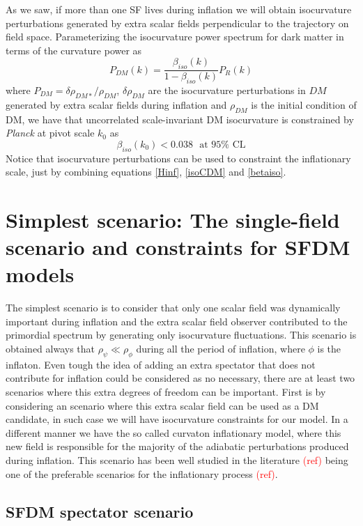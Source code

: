 \documentclass[amssymb,twocolumn,prd,nofootinbib,showpacs]{revtex4-1}
\begin{document}
As we saw, if more than one SF lives during inflation we will obtain isocurvature perturbations generated by extra scalar fields perpendicular to the trajectory on field space. Parameterizing the isocurvature power spectrum for dark matter in terms of the curvature power as
\begin{equation}\label{isoCDM}
P_{DM}(k) = \frac{\beta_{iso}(k)}{1-\beta_{iso}(k)}P_R(k)
\end{equation}
where $P_{DM}=\delta \rho_{DM*}/\rho_{DM}$, $\delta\rho_{DM}$ are the isocurvature perturbations in $DM$ generated by extra scalar fields during inflation and $\rho_{DM}$ is the initial condition of DM, we have that uncorrelated scale-invariant DM isocurvature is constrained by \textit{Planck} \cite{const1,const2} at pivot scale $k_0$ as
\begin{equation}\label{betaiso}
\beta_{iso}(k_0)<0.038 \ \ \ \text{at $95\%$ CL}
\end{equation}
Notice that isocurvature perturbations can be used to constraint the inflationary scale, just by combining equations \eqref{Hinf}, \eqref{isoCDM} and \eqref{betaiso}.
%
%
%
%
%
%
\section{Simplest scenario: The single-field scenario and constraints for SFDM models}\label{simplest}

The simplest scenario is to consider that only one scalar field was dynamically important during inflation and the extra scalar field observer contributed to the primordial spectrum by generating only isocurvature fluctuations. This scenario is obtained always that $\rho_{\psi}\ll \rho_{\phi}$ during all the period of inflation, where $\phi$ is the inflaton. Even tough the idea of adding an extra spectator that does not contribute for inflation could be considered as no necessary, there are at least two scenarios where this extra degrees of freedom can be important. First is by considering an scenario where this extra scalar field can be used as a DM candidate, in such case we will have isocurvature constraints for our model. In a different manner we have the so called curvaton inflationary model, where this new field is responsible for the majority of the adiabatic perturbations produced during inflation. This scenario has been well studied in the literature \textcolor{red}{(ref)} being one of the preferable scenarios for the inflationary process \textcolor{red}{(ref)}. 

\subsection{SFDM spectator scenario}
\end{document}
